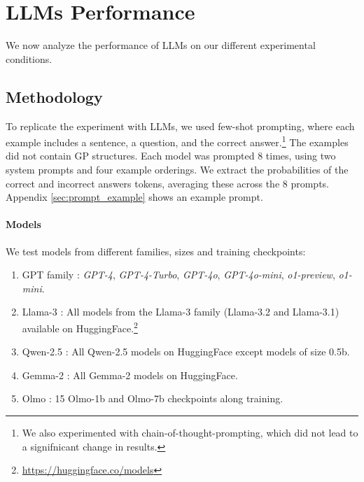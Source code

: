 \section{LLMs Performance}


We now analyze the performance of LLMs on our different experimental conditions. 

\subsection{Methodology}

To replicate the experiment with LLMs, we used few-shot prompting, where each example includes a sentence, a question, and the correct answer.\footnote{We also experimented with chain-of-thought-prompting, which did not lead to a signifnicant change in results.} The examples did not contain GP structures. Each model was prompted 8 times, using two system prompts and four example orderings. We extract the probabilities of the correct and incorrect answers tokens, averaging these across the 8 prompts. Appendix \ref{sec:prompt_example} shows an example prompt.


\paragraph{Models}

We test models from different families, sizes and training checkpoints:
\begin{enumerate}[nosep]
    \item GPT family \cite{gpt4}: \emph{GPT-4}, \emph{GPT-4-Turbo}, \emph{GPT-4o}, \emph{GPT-4o-mini}, \emph{o1-preview}, \emph{o1-mini}.
    \item Llama-3 \cite{llama3herdmodels}: All models from the Llama-3 family (Llama-3.2 and Llama-3.1) available on HuggingFace.\footnote{\url{https://huggingface.co/models}}
    \item Qwen-2.5 \cite{qwen2, qwen2.5}: All Qwen-2.5 models on HuggingFace except models of size 0.5b.
    \item Gemma-2 \cite{gemma2}: All Gemma-2 models on HuggingFace.
    \item Olmo \cite{groeneveld2024olmoacceleratingsciencelanguage}: 15 Olmo-1b and Olmo-7b checkpoints along training.
\end{enumerate}


